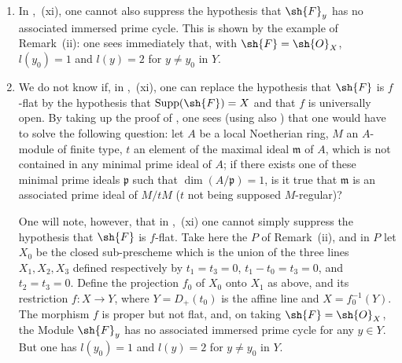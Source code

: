 \begin{remarks}[12.2.3]
\begin{enumerate}[label=(\roman*)]
  \item In ,~(xi), one cannot also suppress the hypothesis that $\sh{F}_y$ has no associated immersed prime cycle.
This is shown by the example of Remark~(ii): one sees immediately that, with $\sh{F}=\sh{O}_X$, $l(y_0)=1$ and $l(y)=2$ for $y\neq y_0$ in $Y$.

  \item We do not know if, in ,~(xi), one can replace the hypothesis that $\sh{F}$ is $f$-flat by the hypothesis that $\operatorname{Supp}(\sh{F})=X$ and that $f$ is universally open.
By taking up the proof of , one sees (using also ) that one would have to solve the following question: let $A$ be a local Noetherian ring, $M$ an $A$-module of finite type,
$t$ an element of the maximal ideal $\mathfrak{m}$ of $A$, which is not contained in any minimal prime ideal of $A$; if there exists one of these minimal prime ideals $\mathfrak{p}$ such that $\dim(A/\mathfrak{p})=1$, is it true that $\mathfrak{m}$ is an associated prime ideal of $M/tM$ ($t$ not being supposed $M$-regular)?

One will note, however, that in ,~(xi) one cannot simply suppress the hypothesis that $\sh{F}$ is $f$-flat. Take here the $P$ of Remark~(ii), and in $P$ let $X_0$ be the closed sub-prescheme which is the union of the three lines $X_1,X_2,X_3$ defined respectively by $t_1=t_3=0$, $t_1-t_0=t_3=0$, and $t_2=t_3=0$. Define the projection $f_0$ of $X_0$ onto $X_1$ as above, and its restriction $f:X\to Y$, where $Y=D_+(t_0)$ is the affine line and $X=f_0^{-1}(Y)$. The morphism $f$ is proper but not flat, and, on taking $\sh{F}=\sh{O}_X$, the Module $\sh{F}_y$ has no associated immersed prime cycle for any $y\in Y$. But one has $l(y_0)=1$ and $l(y)=2$ for $y\neq y_0$ in $Y$.
\end{enumerate}
\end{remarks}

